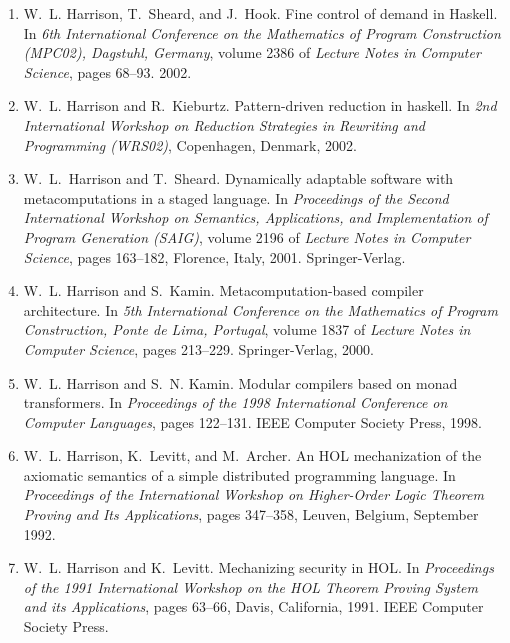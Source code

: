\documentclass[11pt]{article}
\begin{document}
\begin{enumerate}[leftmargin=0.0mm,resume]
\item
W.~L. Harrison, T.~Sheard, and J.~Hook.
\newblock Fine control of demand in {Haskell}.
\newblock In {\em 6th International Conference on the Mathematics of Program
  Construction (MPC02), Dagstuhl, Germany}, volume 2386 of {\em Lecture Notes in Computer Science}, pages 68--93. 2002.



\item
W.~L. Harrison and R.~Kieburtz.
\newblock Pattern-driven reduction in haskell.
\newblock In {\em 2nd International Workshop on Reduction Strategies in
  Rewriting and Programming (WRS02)}, Copenhagen, Denmark, 2002.


\item
W.~L.~Harrison and T.~Sheard.
\newblock Dynamically adaptable software with metacomputations in a staged
  language.
\newblock In {\em Proceedings of the Second International Workshop on
  Semantics, Applications, and Implementation of Program Generation (SAIG)},
  volume 2196 of {\em Lecture Notes in Computer Science}, pages 163--182,
  Florence, Italy, 2001. Springer-Verlag.


\item
W.~L. Harrison and S.~Kamin.
\newblock Metacomputation-based compiler architecture.
\newblock In {\em 5th International Conference on the Mathematics of Program
  Construction, Ponte de Lima, Portugal}, volume 1837 of {\em Lecture Notes in
  Computer Science}, pages 213--229. Springer-Verlag, 2000.


\item
W.~L. Harrison and S.~N. Kamin.
\newblock Modular compilers based on monad transformers.
\newblock In {\em Proceedings of the 1998 International Conference on Computer
  Languages}, pages 122--131. IEEE Computer Society Press, 1998.


\item
W.~L. Harrison, K.~Levitt, and M.~Archer.
\newblock An {HOL} mechanization of the axiomatic semantics of a simple
  distributed programming language.
\newblock In {\em Proceedings of the International Workshop on Higher-Order
  Logic Theorem Proving and Its Applications}, pages 347--358, Leuven, Belgium,
  September 1992.

\item
W.~L. Harrison and K.~Levitt.
\newblock Mechanizing security in {HOL}.
\newblock In {\em Proceedings of the 1991 International Workshop on the {HOL}
  Theorem Proving System and its Applications}, pages 63--66, Davis,
  California, 1991. IEEE Computer Society Press.

\end{enumerate}
\end{document}
